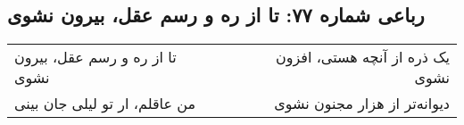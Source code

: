 \begin{center}
\section*{رباعی شماره ۷۷: تا از ره و رسم عقل، بیرون نشوی}
\label{sec:077}
\begin{longtable}{l p{0.5cm} r}
تا از ره و رسم عقل، بیرون نشوی
&&
یک ذره از آنچه هستی، افزون نشوی
\\
من عاقلم، ار تو لیلی جان بینی
&&
دیوانه‌تر از هزار مجنون نشوی
\\
\end{longtable}
\end{center}
